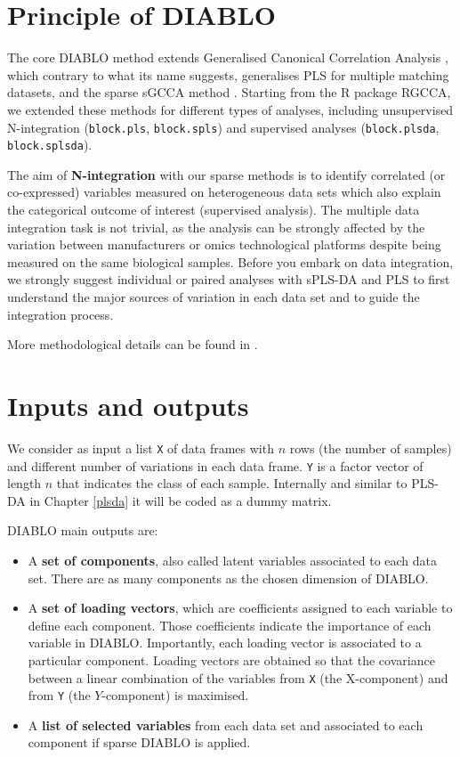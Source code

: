 \documentclass[]{book}
\begin{document}
\hypertarget{principle-of-diablo}{%
\section{Principle of DIABLO}\label{principle-of-diablo}}

The core DIABLO method extends Generalised Canonical Correlation Analysis \citep{Ten11}, which contrary to what its name suggests, generalises PLS for multiple matching datasets, and the sparse sGCCA method \citep{Ten14}. Starting from the R package RGCCA, we extended these methods for different types of analyses, including unsupervised N-integration (\texttt{block.pls}, \texttt{block.spls}) and supervised analyses (\texttt{block.plsda}, \texttt{block.splsda}).

The aim of \textbf{N-integration} with our sparse methods is to identify correlated (or co-expressed) variables measured on heterogeneous data sets which also explain the categorical outcome of interest (supervised analysis). The multiple data integration task is not trivial, as the analysis can be strongly affected by the variation between manufacturers or omics technological platforms despite being measured on the same biological samples. Before you embark on data integration, we strongly suggest individual or paired analyses with sPLS-DA and PLS to first understand the major sources of variation in each data set and to guide the integration process.

More methodological details can be found in \citep{Sin16}.

\hypertarget{inputs-and-outputs-2}{%
\section{Inputs and outputs}\label{inputs-and-outputs-2}}

We consider as input a list \texttt{X} of data frames with \(n\) rows (the number of samples) and different number of variations in each data frame. \texttt{Y} is a factor vector of length \(n\) that indicates the class of each sample. Internally and similar to PLS-DA in Chapter \ref{plsda} it will be coded as a dummy matrix.

DIABLO main outputs are:

\begin{itemize}
\item
  A \textbf{set of components}, also called latent variables associated to each data set. There are as many components as the chosen dimension of DIABLO.
\item
  A \textbf{set of loading vectors}, which are coefficients assigned to each variable to define each component. Those coefficients indicate the importance of each variable in DIABLO. Importantly, each loading vector is associated to a particular component. Loading vectors are obtained so that the covariance between a linear combination of the variables from \texttt{X} (the X-component) and from \texttt{Y} (the \(Y\)-component) is maximised.
\item
  A \textbf{list of selected variables} from each data set and associated to each component if sparse DIABLO is applied.
\end{itemize}
\end{document}
